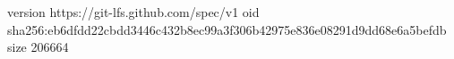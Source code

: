version https://git-lfs.github.com/spec/v1
oid sha256:eb6dfdd22cbdd3446c432b8ec99a3f306b42975e836e08291d9dd68e6a5befdb
size 206664
